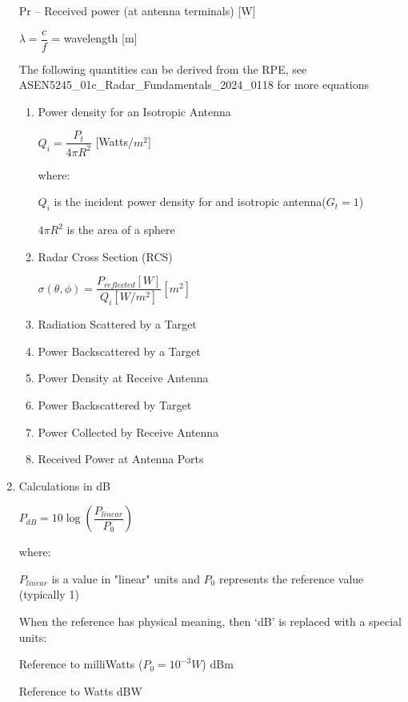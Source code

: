 \documentclass[10pt]{article}
\renewcommand{\frac}{\dfrac}
\begin{document}
\begin{enumerate}
	Pr – Received power (at antenna terminals) [W]
	
	$\lambda = \frac{c}{f}$ = wavelength [m]

\break
	The following quantities can be derived from the RPE, see ASEN5245\_01c\_Radar\_Fundamentals\_2024\_0118 for more equations

	\begin{enumerate}	
		\item Power density for an Isotropic Antenna

		\centerline{$Q_i = \frac{P_t}{4\pi R^2}$ [Watts/$m^2$]} 

		where:
	
		$Q_i$ is the incident power density for and isotropic antenna($G_t = 1$)
	
		$4 \pi R^2$ is the area of a sphere
	

		\item Radar Cross Section (RCS)

		\centerline{$\sigma (\theta,\phi) = \frac{P_{reflected}[W]}{Q_i [W/m^2]}[m^2]$}
	
		\item Radiation Scattered by a Target

		\item Power Backscattered by a Target

		\item Power Density at Receive Antenna

		\item Power Backscattered by Target

		\item Power Collected by Receive Antenna

		\item Received Power at Antenna Ports

	\end{enumerate}

\item Calculations in dB

	\centerline{$P_{dB} = 10\log (\frac{P_{linear}}{P_0})$}
	
	where:
	
	$P_{linear}$ is a value in "linear" units and $P_0$ represents the reference value (typically 1)
	
	When the reference has physical meaning, then ‘dB’ is replaced with
a special units:

Reference to milliWatts ($P_0 = 10^{-3}  W$) dBm

Reference to Watts dBW


\end{enumerate}
\end{document}
